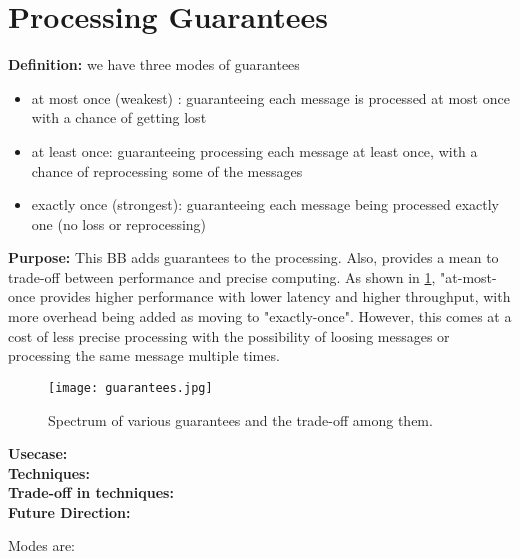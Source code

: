 \section{Processing Guarantees}

	\noindent\textbf{Definition:} we have three modes of guarantees 
	\begin{itemize}
		\item at most once (weakest) : guaranteeing each message is processed at most once with a chance of getting lost
		\item at least once: guaranteeing processing each message at least once, with a chance of reprocessing some of the messages
		\item exactly once (strongest): guaranteeing each message being processed exactly one (no loss or reprocessing)
	\end{itemize}	 

	\noindent \textbf{Purpose:} This BB adds guarantees to the processing. Also, provides a mean to trade-off between performance and precise computing. As shown in \ref{fig:guarantees}, "at-most-once provides higher performance with lower latency and higher throughput, with more overhead being added as moving to "exactly-once". However, this comes at a cost of less precise processing with the possibility of loosing messages or processing the same message multiple times.
	
	\begin{figure}[h]
		\centering
		\texttt{[image: guarantees.jpg]}
		\caption{Spectrum of various guarantees and the trade-off among them. }
		\label{fig:guarantees}
	\end{figure}
	
	
	\noindent \textbf{Usecase:} 
\\	\noindent \textbf{Techniques: }
\\	\noindent \textbf{Trade-off in techniques: } 
\\	\noindent \textbf{Future Direction:} 


Modes are:






